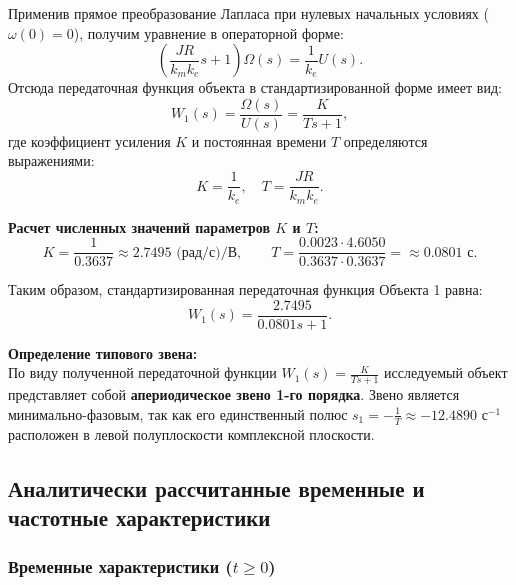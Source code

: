 \documentclass[12pt, a4paper]{article}
\begin{document}
Применив прямое преобразование Лапласа при нулевых начальных условиях ($\omega(0) = 0$), получим уравнение в операторной форме:
\[
    \left(\frac{JR}{k_m k_e}s + 1\right)\Omega(s) = \frac{1}{k_e}U(s).
\]
Отсюда передаточная функция объекта в стандартизированной форме имеет вид:
\begin{equation}
    W_1(s) = \frac{\Omega(s)}{U(s)} = \frac{K}{Ts + 1},
\end{equation}
где коэффициент усиления $K$ и постоянная времени $T$ определяются выражениями:
\[
    K = \frac{1}{k_e}, \quad T = \frac{JR}{k_m k_e}.
\]

\textbf{Расчет численных значений параметров $K$ и $T$:}
\[
    K = \frac{1}{0.3637} \approx 2.7495 \text{ (рад/с)/В}, \qquad T = \frac{0.0023 \cdot 4.6050}{0.3637 \cdot 0.3637} = \approx 0.0801 \text{ с}.
\]

Таким образом, стандартизированная передаточная функция Объекта 1 равна:
\begin{equation}
    W_1(s) = \frac{2.7495}{0.0801s + 1}.
\end{equation}

\textbf{Определение типового звена:} \\
По виду полученной передаточной функции $W_1(s) = \frac{K}{Ts+1}$ исследуемый объект представляет собой \textbf{апериодическое звено 1-го порядка}. Звено является минимально-фазовым, так как его единственный полюс $s_1 = -\frac{1}{T} \approx -12.4890\text{ с}^{-1}$ расположен в левой полуплоскости комплексной плоскости.

\subsection{Аналитически рассчитанные временные и частотные характеристики}

\subsubsection{Временные характеристики ($t \ge 0$)}
\end{document}
